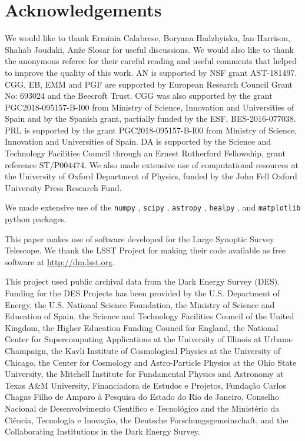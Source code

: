 \documentclass[a4paper,11pt]{article}
\begin{document}
  \section*{Acknowledgements}
    We would like to thank Erminia Calabrese, Boryana Hadzhyiska, Ian Harrison, Shahab Joudaki, An\v{z}e Slosar for useful discussions. We would also like to thank the anonymous referee for their careful reading and useful comments that helped to improve the quality of this work. AN is supported by NSF grant AST-181497. CGG, EB, EMM and PGF are supported by European Research Council Grant No:  693024 and the Beecroft Trust. CGG was also supported by the grant PGC2018-095157-B-I00 from Ministry of Science, Innovation and Universities of Spain and by the Spanish grant, partially funded by the ESF, BES-2016-077038. PRL is supported by the grant PGC2018-095157-B-I00 from Ministry of Science, Innovation and Universities of Spain. DA is supported by the Science and Technology Facilities Council through an Ernest Rutherford Fellowship, grant reference ST/P004474. We also made extensive use of computational resources at the University of Oxford Department of Physics, funded by the John Fell Oxford University Press Research Fund.

    We made extensive use of the {\tt numpy} \citep{oliphant2006guide, van2011numpy}, {\tt scipy} \citep{2020SciPy-NMeth}, {\tt astropy} \citep{1307.6212, 1801.02634}, {\tt healpy} \citep{Zonca2019}, and {\tt matplotlib} \citep{Hunter:2007} python packages.
   
    This paper makes use of software developed for the Large Synoptic Survey Telescope. We thank the LSST Project for making their code available as free software at \url{http://dm.lsst.org}.
   
    This project used public archival data from the Dark Energy Survey (DES). Funding for the DES Projects has been provided by the U.S. Department of Energy, the U.S. National Science Foundation, the Ministry of Science and Education of Spain, the Science and Technology Facilities Council of the United Kingdom, the Higher Education Funding Council for England, the National Center for Supercomputing Applications at the University of Illinois at Urbana-Champaign, the Kavli Institute of Cosmological Physics at the University of Chicago, the Center for Cosmology and Astro-Particle Physics at the Ohio State University, the Mitchell Institute for Fundamental Physics and Astronomy at Texas A\&M University, Financiadora de Estudos e Projetos, Funda{\c c}{\~a}o Carlos Chagas Filho de Amparo {\`a} Pesquisa do Estado do Rio de Janeiro, Conselho Nacional de Desenvolvimento Cient{\'i}fico e Tecnol{\'o}gico and the Minist{\'e}rio da Ci{\^e}ncia, Tecnologia e Inova{\c c}{\~a}o, the Deutsche Forschungsgemeinschaft, and the Collaborating Institutions in the Dark Energy Survey.
        
\end{document}
